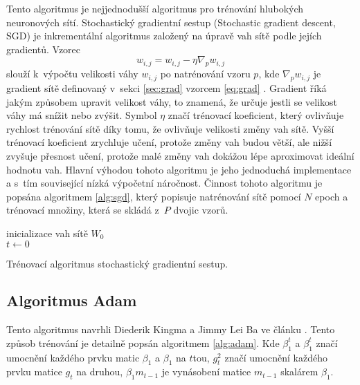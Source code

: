 Tento algoritmus je nejjednodušší algoritmus pro trénování hlubokých neuronových sítí.
Stochastický gradientní sestup (Stochastic gradient descent, SGD) je inkrementální algoritmus založený na úpravě vah sítě podle jejích gradientů.
Vzorec \begin{equation}w_{i,j} = w_{i,j}-\eta\nabla_{p}w_{i,j}\label{eq:sgd}\end{equation} slouží k~výpočtu velikosti váhy $w_{i,j}$ po natrénování vzoru $p$, kde $\nabla_{p}w_{i,j}$ je gradient sítě definovaný v~sekci \ref{sec:grad} vzorcem \ref{eq:grad} .
Gradient říká jakým způsobem upravit velikost váhy, to znamená, že určuje jestli se velikost váhy má snížit nebo zvýšit.
Symbol $\eta$ značí trénovací koeficient, který ovlivňuje rychlost trénování sítě díky tomu, že ovlivňuje velikosti změny vah sítě.
Vyšší trénovací koeficient zrychluje učení, protože změny vah budou větší, ale nižší zvyšuje přesnost učení, protože malé změny vah dokážou lépe aproximovat ideální hodnotu vah.
Hlavní výhodou tohoto algoritmu je jeho jednoduchá implementace a s~tím související nízká výpočetní náročnost.
Činnost tohoto algoritmu je popsána algoritmem \ref{alg:sgd}, který popisuje natrénování sítě pomocí $N$ epoch a trénovací množiny, která se skládá z~$P$ dvojic vzorů.

\begin{algorithm}
    \SetAlgoLined
    inicializace vah sítě $W_0$\\
    $t \leftarrow 0$\\
\caption{Trénovací algoritmus stochastický gradientní sestup.}
\label{alg:sgd}
\end{algorithm}

\subsection{Algoritmus Adam}
\label{sub:adam}

Tento algoritmus navrhli Diederik Kingma a Jimmy Lei Ba ve článku \cite{Kingma2015}.
Tento způsob trénování je detailně popsán algoritmem \ref{alg:adam}.
Kde $\beta_{1}^{t}$ a $\beta_{1}^{t}$ značí umocnění každého prvku matic $\beta_{1}$ a $\beta_{1}$ na $t$tou, $g_{t}^{2}$ značí umocnění každého prvku matice $g_{t}$ na druhou, $\beta_{1}m_{t-1}$ je vynásobení matice $m_{t-1}$ skalárem $\beta_{1}$.


